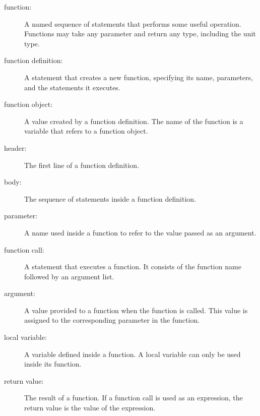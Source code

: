 \documentclass[10pt]{book}
\begin{document}
\begin{description}

\item[function:] A named sequence of statements that performs some
useful operation.  Functions may take any parameter and return any 
type, including the unit type.

\item[function definition:]  A statement that creates a new function,
specifying its name, parameters, and the statements it executes.

\item[function object:]  A value created by a function definition.
The name of the function is a variable that refers to a function
object.

\item[header:] The first line of a function definition.

\item[body:] The sequence of statements inside a function definition.

\item[parameter:] A name used inside a function to refer to the value
passed as an argument.

\item[function call:] A statement that executes a function. It
consists of the function name followed by an argument list.

\item[argument:]  A value provided to a function when the function is called.
This value is assigned to the corresponding parameter in the function.

\item[local variable:]  A variable defined inside a function.  A local
variable can only be used inside its function.

\item[return value:]  The result of a function.  If a function call
is used as an expression, the return value is the value of
the expression.




\end{description}
\end{document}
